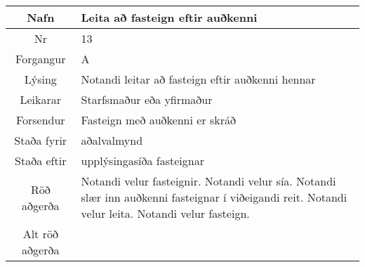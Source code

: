 \documentclass[a4paper]{article}
\begin{document}
\begin{tabular}{|c|p{10cm}|}
\hline
Nafn&Leita að fasteign eftir auðkenni\\
\hline
Nr&13\\
\hline
Forgangur&A\\
\hline
Lýsing&Notandi leitar að fasteign eftir auðkenni hennar\\
\hline
Leikarar&Starfsmaður eða yfirmaður\\
\hline
Forsendur&Fasteign með auðkenni er skráð\\
\hline
Staða fyrir&aðalvalmynd\\
\hline
Staða eftir&upplýsingasíða fasteignar\\
\hline
Röð aðgerða&Notandi velur fasteignir. Notandi velur sía. Notandi slær inn auðkenni fasteignar í viðeigandi reit. Notandi velur leita. Notandi velur fasteign.\\
\hline
Alt röð aðgerða&\\
\hline
\end{tabular}
\end{document}
